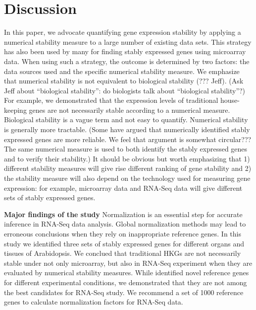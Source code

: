 \documentclass[11pt, a4paper]{article}
\begin{document}
  \section{Discussion}\label{section:discussion}
In this paper, we advocate quantifying gene expression stability by applying a
numerical stability measure to a large number of existing data sets.  This
strategy has also been used by many for finding stably expressed genes using
microarray data.  When using such a strategy, the outcome is determined by two
factors: the data sources used and the specific numerical stability measure.
We emphasize that numerical stability is not equivalent to biological
stability (??? Jeff).  (Ask Jeff about  ``biological stability'': do
biologists talk about ``biological stability''?) For example, we demonstrated
that the expression levels of traditional house-keeping genes are not
necessarily stable according to a numerical measure. 
Biological stability is a vague term and not easy to quantify.  Numerical
stability is generally more tractable. (Some have argued that numerically
identified stably expressed genes are more reliable. We feel that argument is
somewhat circular??? The same numerical measure is used to both identify the
stably expressed genes and to verify their stability.) It should be obvious
but worth emphasizing that 1) different stability measures will give rise
different ranking of gene stability and 2) the stability measure will also
depend on the technology used for measuring gene expression: for example,
microarray data and RNA-Seq data will give different sets of stably expressed
genes.


  \textbf{Major findings of the study}
  Normalization is an essential step for accurate inference in RNA-Seq data analysis. Global normalization methods may lead to erroneous conclusions when they rely on inappropriate reference genes. In this study we identified three sets of stably expressed genes for different organs and tissues of Arabidopsis. We conclued that traditional HKGs are not necessarily stable under not only microarray, but also in RNA-Seq experiment when they are evaluated by numerical stability measures. While \cite{czechowski2005genome} identified novel reference genes for different experimental conditions, we demonstrated that they are not among the best candidates for RNA-Seq study. We recommend a set of 1000 reference genes to calculate normalization factors for RNA-Seq data.  
   
\end{document}
